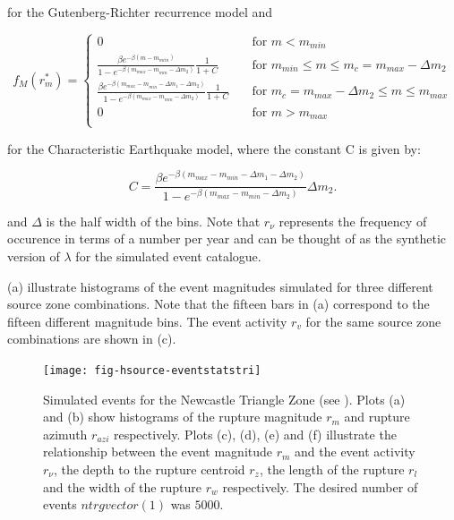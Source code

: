 \begin{enumerate}
for the Gutenberg-Richter recurrence model \citep{dr_Kramer96a} and 

\begin{equation} \label{eq:pdf_ch}
f_M(r_m^*) = \left\{
\begin{array}{ll}
0 & \quad \mbox{for $m < m_{min}$} \\
\frac{\beta e ^{- \beta (m-m_{miin})}}{1-e^{-\beta (m_{max} - m_{min} - \Delta m_{2})}} \frac{1}{1+C}& \quad \mbox{for $m_{min} \leq m \leq m_{c} = m_{max} - \Delta m_{2}$} \\
\frac{\beta e ^{- \beta (m_{max}-m_{min}-\Delta m_{1} - \Delta m_{2})}}{1-e^{-\beta (m_{max} - m_{min} - \Delta m_{2})}}  \frac{1}{1+C}& \quad \mbox{for $m_{c} = m_{max} - \Delta m_{2} \leq m \leq m_{max}$} \\
0 & \quad \mbox{for $m > m_{max}$} \\ 
\end{array}
 \right. 
\end{equation}

for the Characteristic Earthquake model\citep{eqrm_Schwartz84}, where the constant C is given by:

\begin{equation}
C = \frac{\beta e ^{- \beta (m_{max}-m_{min}-\Delta m_{1} - \Delta m_{2})}}  {1-e^{-\beta (m_{max} - m_{min} - \Delta m_{2})}}  \Delta m_{2} .
\end{equation}


\citep{dr_Kramer96a} and $\Delta$ is the half width of the bins.
Note that $r_\nu$ represents the frequency of occurence in terms
of a number per year and can be thought of as the synthetic
version of $\lambda$ for the simulated event catalogue.
\end{enumerate}



(a)
illustrate histograms of the event magnitudes simulated for three
different source zone combinations. Note that the fifteen bars in
(a)
correspond to the fifteen different magnitude bins. The event
activity $r_v$ for the same source zone combinations are shown in
(c).

\begin{figure}
  \vspace{0.8em}
\begin{center}
\texttt{[image: fig-hsource-eventstatstri]}
\end{center}
\caption{Simulated events for the Newcastle Triangle Zone (see
\citealt{dr_Dhu02b}). Plots (a) and (b) show histograms of the
rupture magnitude $r_m$ and rupture azimuth $r_{azi}$
respectively. Plots (c), (d), (e) and (f) illustrate the
relationship between the event magnitude $r_m$ and the event
activity $r_\nu$, the depth to the rupture centroid $r_z$, the
length of the rupture $r_l$ and the width of the rupture $r_w$
respectively. The desired number of events $ntrgvector(1)$ was
$5000$.} \label{fig:source-catalogue-results1}
\end{figure}

